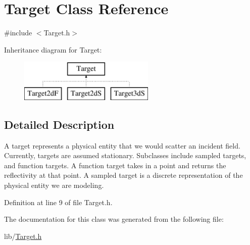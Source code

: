 \hypertarget{class_target}{}\section{Target Class Reference}
\label{class_target}


{\ttfamily \#include $<$Target.\+h$>$}

Inheritance diagram for Target\+:\begin{figure}[H]
\begin{center}
\leavevmode
\includegraphics[height=2.000000cm]{class_target}
\end{center}
\end{figure}


\subsection{Detailed Description}
A target represents a physical entity that we would scatter an incident field. Currently, targets are assumed stationary. Subclasses include sampled targets, and function targets. A function target takes in a point and returns the reflectivity at that point. A sampled target is a discrete representation of the physical entity we are modeling. 

Definition at line 9 of file Target.\+h.



The documentation for this class was generated from the following file\+:\begin{DoxyCompactItemize}
\item 
lib/\hyperlink{_target_8h}{Target.\+h}\end{DoxyCompactItemize}
